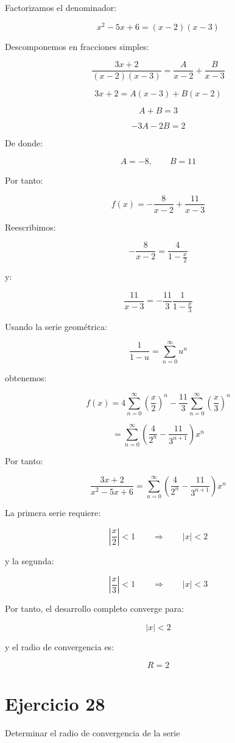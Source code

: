 \documentclass[fleqn]{article}
\begin{document}
	Factorizamos el denominador:

	\[
	x^2-5x+6=(x-2)(x-3)
	\]

	Descomponemos en fracciones simples:

	\[
	\frac{3x+2}{(x-2)(x-3)}
	=
	\frac{A}{x-2}
	+
	\frac{B}{x-3}
	\]

	\[
	3x+2
	=
	A(x-3)+B(x-2)
	\]

	\[
	A+B=3
	\]

	\[
	-3A-2B=2
	\]

	De donde:

	\[
	A=-8,
	\qquad
	B=11
	\]

	Por tanto:

	\[
	f(x)
	=
	-\frac{8}{x-2}
	+
	\frac{11}{x-3}
	\]

	Reescribimos:

	\[
	-\frac{8}{x-2}
	=
	\frac{4}{1-\frac{x}{2}}
	\]

	y:

	\[
	\frac{11}{x-3}
	=
	-\frac{11}{3}
	\frac{1}{1-\frac{x}{3}}
	\]

	Usando la serie geométrica:

	\[
	\frac{1}{1-u}
	=
	\sum_{n=0}^{\infty}u^n
	\]

	obtenemos:

	\[
	f(x)
	=
	4\sum_{n=0}^{\infty}
	\left(\frac{x}{2}\right)^n
	-
	\frac{11}{3}
	\sum_{n=0}^{\infty}
	\left(\frac{x}{3}\right)^n
	\]

	\[
	=
	\sum_{n=0}^{\infty}
	\left(
	\frac{4}{2^n}
	-
	\frac{11}{3^{n+1}}
	\right)x^n
	\]

	Por tanto:

	\[
	\boxed{
	\frac{3x+2}{x^2-5x+6}
	=
	\sum_{n=0}^{\infty}
	\left(
	\frac{4}{2^n}
	-
	\frac{11}{3^{n+1}}
	\right)x^n
	}
	\]

	La primera serie requiere:

	\[
	\left|\frac{x}{2}\right|<1
	\qquad\Longrightarrow\qquad
	|x|<2
	\]

	y la segunda:

	\[
	\left|\frac{x}{3}\right|<1
	\qquad\Longrightarrow\qquad
	|x|<3
	\]

	Por tanto, el desarrollo completo converge para:

	\[
	|x|<2
	\]

	y el radio de convergencia es:

	\[
	\boxed{
	R=2
	}
	\]

\section{Ejercicio 28}
	Determinar el radio de convergencia de la serie
\end{document}
